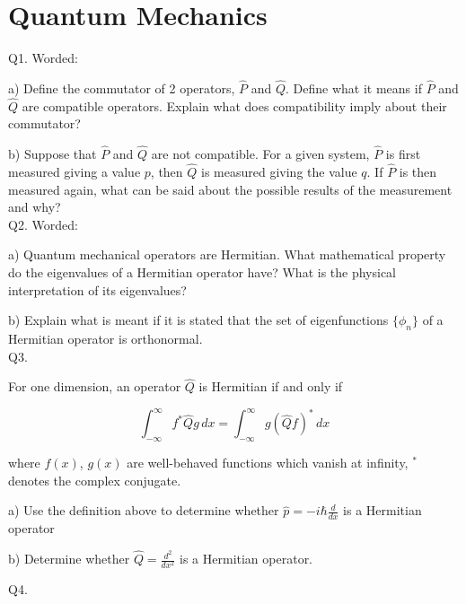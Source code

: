 \documentclass[a4paper,11pt]{article}
\begin{document}
\newpage

\section{Quantum Mechanics}

\noindent Q1. Worded:

\noindent a) Define the commutator of 2 operators, \( \hat{P} \) and \( \hat{Q} \). Define what it means if \( \hat{P} \) and \( \hat{Q} \) are compatible operators. Explain what does compatibility imply about their commutator?

\medskip

\noindent b) Suppose that \( \hat{P} \) and \( \hat{Q} \) are not compatible. For a given system, \( \hat{P} \) is first measured giving a value \( p \), then \( \hat{Q} \) is measured giving the value \( q \). If \( \hat{P} \) is then measured again, what can be said about the possible results of the measurement and why? \\

\noindent Q2. Worded:

\noindent a) Quantum mechanical operators are Hermitian. What mathematical property do the eigenvalues of a Hermitian operator have? What is the physical interpretation of its eigenvalues?

\medskip

\noindent b) Explain what is meant if it is stated that the set of eigenfunctions \( \{ \phi_{n} \} \) of a Hermitian operator is orthonormal. \\

\noindent Q3.

\noindent For one dimension, an operator \( \hat{Q} \) is Hermitian if and only if 

\[ \int_{-\infty}^{\infty} f^{*}\hat{Q}g \, dx = \int_{-\infty}^{\infty} g(\hat{Q}f)^{*} \, dx \]

\noindent where \( f(x) \), \( g(x) \) are well-behaved functions which vanish at infinity, \( ^{*} \) denotes the complex conjugate. 

\medskip

\noindent a) Use the definition above to determine whether \( \hat{p} = -i\hbar\frac{d}{dx} \) is a Hermitian operator 

\medskip

\noindent b) Determine whether \( \hat{Q} = \frac{d^{2}}{dx^{2}} \) is a Hermitian operator.

\bigskip

\noindent Q4. 
\end{document}
